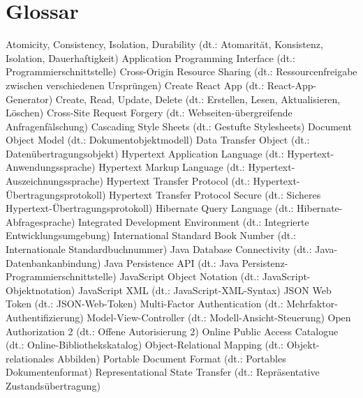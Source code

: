 \chapter{Glossar}

   {Atomicity, Consistency, Isolation, Durability (dt.: Atomarität, Konsistenz, Isolation, Dauerhaftigkeit)}
    {Application Programming Interface (dt.: Programmierschnittstelle)}
   {Cross-Origin Resource Sharing (dt.: Ressourcenfreigabe zwischen verschiedenen Ursprüngen)}
    {Create React App (dt.: React-App-Generator)}
   {Create, Read, Update, Delete (dt.: Erstellen, Lesen, Aktualisieren, Löschen)}
   {Cross-Site Request Forgery (dt.: Webseiten-übergreifende Anfragenfälschung)}
    {Cascading Style Sheets (dt.: Gestufte Stylesheets)}
    {Document Object Model (dt.: Dokumentobjektmodell)}
    {Data Transfer Object (dt.: Datenübertragungsobjekt)}
    {Hypertext Application Language (dt.: Hypertext-Anwendungssprache)}
   {Hypertext Markup Language (dt.: Hypertext-Auszeichnungssprache)}
   {Hypertext Transfer Protocol (dt.: Hypertext-Übertragungsprotokoll)}
  {Hypertext Transfer Protocol Secure (dt.: Sicheres Hypertext-Übertragungsprotokoll)}
    {Hibernate Query Language (dt.: Hibernate-Abfragesprache)}
    {Integrated Development Environment (dt.: Integrierte Entwicklungsumgebung)}
   {International Standard Book Number (dt.: Internationale Standardbuchnummer)}
   {Java Database Connectivity (dt.: Java-Datenbankanbindung)}
    {Java Persistence API (dt.: Java Persistenz-Programmierschnittstelle)}
   {JavaScript Object Notation (dt.: JavaScript-Objektnotation)}
    {JavaScript XML (dt.: JavaScript-XML-Syntax)}
    {JSON Web Token (dt.: JSON-Web-Token)}
    {Multi-Factor Authentication (dt.: Mehrfaktor-Authentifizierung)}
    {Model-View-Controller (dt.: Modell-Ansicht-Steuerung)}
 {Open Authorization 2 (dt.: Offene Autorisierung 2)}
   {Online Public Access Catalogue (dt.: Online-Bibliothekskatalog)}
    {Object-Relational Mapping (dt.: Objekt-relationales Abbilden)}
    {Portable Document Format (dt.: Portables Dokumentenformat)}
 {Representational State Transfer (dt.: Repräsentative Zustandsübertragung)}

